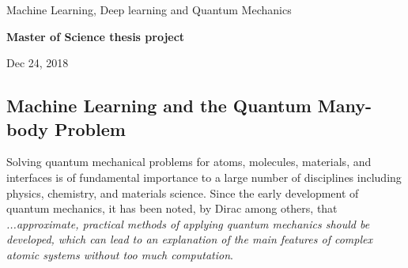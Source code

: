 \documentclass[%
oneside,                 %
final,                   %
10pt]{article}
\begin{document}

\newcommand{\exercisesection}[1]{\subsection*{#1}}






\thispagestyle{empty}

\begin{center}
{\LARGE\bf
\begin{spacing}{1.25}
Machine Learning, Deep learning and Quantum Mechanics
\end{spacing}
}
\end{center}


\begin{center}
{\bf Master of Science thesis project${}^{}$} \\ [0mm]
\end{center}

\begin{center}
\end{center}
    

\begin{center}
Dec 24, 2018
\end{center}

\vspace{1cm}


\subsection{Machine Learning and the Quantum Many-body Problem}

Solving quantum mechanical problems for atoms,  molecules, materials, and
interfaces is of fundamental importance to a large number of
disciplines including physics, chemistry, and materials science. Since
the early development of quantum mechanics, it has been noted, by
Dirac among others, that \emph{...approximate, practical methods of applying quantum mechanics should be developed, which can lead to an explanation of the main features of complex atomic systems without too much computation}. 
\end{document}
